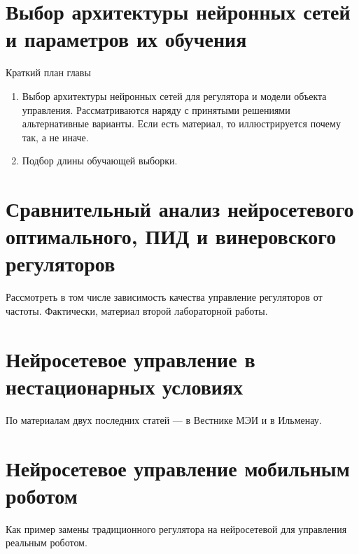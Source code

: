 \documentclass[12pt]{rusthesis}
\begin{document}
\chapter{Выбор архитектуры нейронных сетей и параметров их обучения}
\centerline{Краткий план главы}
\begin{enumerate}
\item Выбор архитектуры нейронных сетей для регулятора и модели
  объекта управления.  Рассматриваются наряду с принятыми решениями
  альтернативные варианты.  Если есть материал, то иллюстрируется
  почему так, а не иначе.
\item Подбор длины обучающей выборки.
\end{enumerate}
%

\chapter{Сравнительный анализ нейросетевого оптимального, ПИД и винеровского регуляторов}
Рассмотреть в том числе зависимость качества управление регуляторов от
частоты.  Фактически, материал второй лабораторной работы.
%

\chapter{Нейросетевое управление в нестационарных условиях}
По материалам двух последних статей --- в Вестнике МЭИ и в Ильменау.
%

\chapter{Нейросетевое управление мобильным роботом}
Как пример замены традиционного регулятора на нейросетевой для
управления реальным роботом.
%

\end{document}
